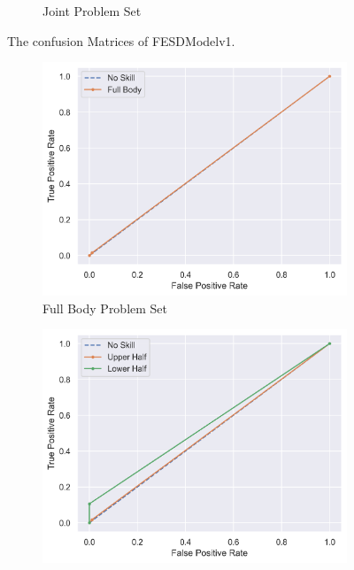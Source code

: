 \begin{figure}[ht]
\begin{subfigure}[b]{0.47\linewidth}
      \caption[]{Joint Problem Set}
      \label{fig:jt_conf_v1}
  \end{subfigure}
  \caption[Confusion Matrices of FESDModelv1]{The confusion Matrices of FESDModelv1.}
  \label{fig:conf_v1}
\end{figure}

\begin{figure}
  \centering
  \begin{subfigure}[b]{0.47\linewidth}
      \centering
      \includegraphics[width=\textwidth]{figures/Results/v1_bs_60_is_64_e_100/fb/roc.png}
      \caption[]{Full Body Problem Set}
      \label{fig:fb_roc_v1}
  \end{subfigure}
  \hfill
  \begin{subfigure}[b]{0.47\linewidth}
      \centering
      \includegraphics[width=\textwidth]{figures/Results/v1_bs_60_is_64_e_100/hb/roc.png}

\end{subfigure}
\end{figure}
